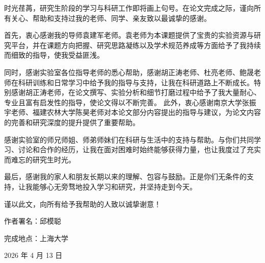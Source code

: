 \begin{acknowledgement}
  时光荏苒，研究生阶段的学习与科研工作即将画上句号。在论文完成之际，谨向所有关心、帮助和支持过我的老师、同学、亲友致以最诚挚的感谢。

  首先，衷心感谢我的导师袁建军老师。袁老师为本课题提供了宝贵的实验资源与研究平台，并在课题方向把握、研究思路凝练以及学术规范养成等方面给予了我持续而细致的指导，使我受益匪浅。

  同时，感谢实验室各位指导老师的悉心帮助，感谢胡正涛老师、杜亮老师、鲍晟老师在科研训练和日常学习中给予我的指导与支持，让我在科研道路上不断成长。特别感谢胡正涛老师，在论文撰写、实验分析和细节打磨过程中给予了我大量耐心、专业且富有启发性的指导，使论文得以不断完善。
  此外，衷心感谢南京大学张振宇老师、福建农林大学陈昊老师对本论文部分内容提出的指导与建议，为论文内容的完善和研究深度的提升提供了重要帮助。

  感谢实验室的师兄师姐、师弟师妹们在科研与生活中的支持与帮助。与你们共同学习、讨论和合作的经历，让我在面对困难时始终能够获得力量，也让我度过了充实而难忘的研究生时光。

  最后，感谢我的家人和朋友长期以来的理解、包容与鼓励。正是你们无条件的支持，让我能够心无旁骛地投入学习和研究，并坚持走到今天。

  谨以此文，向所有给予我帮助的人致以诚挚谢意！

  \vspace{50bp}

  \hfill 作者署名：邱模聪

  \hfill 完成地点：上海大学

  \hfill 2026 年 4 月 13 日

\end{acknowledgement}
